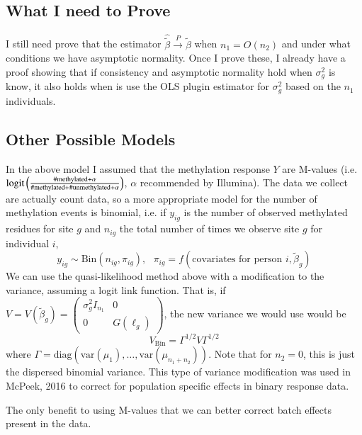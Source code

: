 \documentclass{article}
\begin{document}
\subsection{What I need to Prove}
I still need prove that the estimator $\hat{\tilde{\beta}} \stackrel{P}{\to} \tilde{\beta}$ when $n_1 = O\left( n_2 \right)$ and under what conditions we have asymptotic normality. Once I prove these, I already have a proof showing that if consistency and asymptotic normality hold when $\sigma_g^2$ is know, it also holds when is use the OLS plugin estimator for $\sigma_g^2$ based on the $n_1$ individuals.

\subsection{Other Possible Models}
In the above model I assumed that the methylation response $Y$ are M-values (i.e. $\text{logit}\left( \frac{\#\text{methylated$ + \alpha$}}{\#\text{methylated} + \#\text{unmethylated$ + \alpha$}} \right)$, $\alpha$ recommended by Illumina). The data we collect are actually count data, so a more appropriate model for the number of methylation events is binomial, i.e. if $y_{ig}$ is the number of observed methylated residues for site $g$ and $n_{ig}$ the total number of times we observe site $g$ for individual $i$,
\[
y_{ig} \sim \text{Bin}\left( n_{ig}, \pi_{ig} \right), \text{ } \pi_{ig} = f\left( \text{covariates for person $i$}, \tilde{\beta}_g \right)
\]
We can use the quasi-likelihood method above with a modification to the variance, assuming a logit link function. That is, if $V = V\left( \tilde{\beta}_g \right) = \left( \begin{matrix}
\sigma_g^2 I_{n_1} & 0\\
0 & G\left( \ell_g \right)
\end{matrix} \right)$, the new variance we would use would be
\[
V_{\text{Bin}} = \Gamma^{1/2} V \Gamma^{1/2}
\]
where $\Gamma = \text{diag}\left( \text{var}\left( \mu_1 \right), \ldots, \text{var}\left( \mu_{n_1 + n_2} \right) \right)$. Note that for $n_2 = 0$, this is just the dispersed binomial variance. This type of variance modification was used in McPeek, 2016 to correct for population specific effects in binary response data.

The only benefit to using M-values that we can better correct batch effects present in the data.
\end{document}
